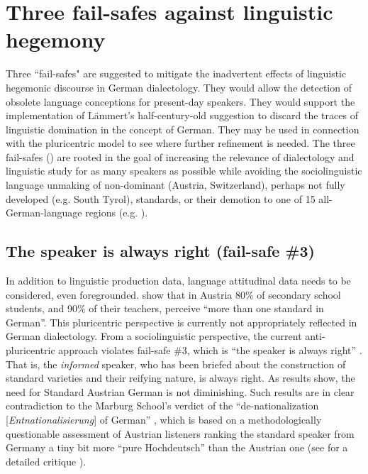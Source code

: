 \documentclass[output=paper]{langscibook}
\begin{document}
\section{Three fail-safes against linguistic hegemony} 
\label{sec:dollinger:4}
Three ``fail-safes" are suggested to mitigate the inadvertent effects of linguistic hegemonic discourse in German dialectology. They would allow the detection of obsolete language conceptions for present-day speakers. They would support the implementation of Lämmert’s half-century-old suggestion to discard the traces of linguistic domination in the concept of German. They may be used in connection with the pluricentric model to see where further refinement is needed. The three fail-safes (\cites{Dollinger2019b}[107--114]{Dollinger2019c}) are rooted in the goal of increasing the relevance of dialectology and linguistic study for as many speakers as possible while avoiding the sociolinguistic language unmaking of non-dominant (Austria, Switzerland), perhaps not fully developed (e.g. South Tyrol), standards, or their demotion to one of 15 all-German-language regions (e.g. \citealt{DürscheidElspaß2015}).


\subsection{The speaker is always right (fail-safe \#3)}
\label{sec:dollinger:4.1}
In addition to linguistic production data, language attitudinal data needs to be considered, even foregrounded.  \citet[137, Abb. 36]{DeCilliaRansmayr2019} show that in Austria 80\% of secondary school students, and 90\% of their teachers, perceive “more than one standard in German”. This pluricentric perspective is currently not appropriately reflected in German dialectology. From a sociolinguistic perspective, the current anti-pluricentric approach violates fail-safe \#3, which is “the speaker is always right” \citep[113--114]{Dollinger2019c}. That is, the \textit{informed} speaker, who has been briefed about the construction of standard varieties and their reifying nature, is always right. As  results show, the need for Standard Austrian German is not diminishing. Such results are in clear contradiction to the Marburg School’s verdict of the “de-nationalization [\textit{Entnationalisierung}] of German” \citep[157]{Herrgen2015}, which is based on a methodologically questionable assessment of Austrian listeners ranking the standard speaker from Germany a tiny bit more “pure Hochdeutsch” than the Austrian one \citep[154]{Herrgen2015} (see for a detailed critique \citealt[78--84]{Dollinger2019c}).
\end{document}
